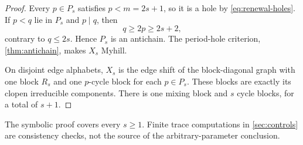 \begin{proof}
Every $p\in P_s$ satisfies $p<m=2s+1$, so it is a hole by
\eqref{eq:renewal-holes}.  If $p<q$ lie in $P_s$ and $p\mid q$, then
\[
 q\geq2p\geq2s+2,
\]
contrary to $q\leq2s$.  Hence $P_s$ is an antichain.  The
period-hole criterion, \cref{thm:antichain}, makes $X_s$ Myhill.

On disjoint edge alphabets, $X_s$ is the edge shift of the block-diagonal
graph with one block $R_s$ and one $p$-cycle block for each $p\in P_s$.
These blocks are exactly its clopen irreducible components.  There is one
mixing block and $s$ cycle blocks, for a total of $s+1$.
\end{proof}

\begin{remark}
The symbolic proof covers every $s\geq1$.  Finite trace computations in
\cref{sec:controls} are consistency checks, not the source of the
arbitrary-parameter conclusion.
\end{remark}

